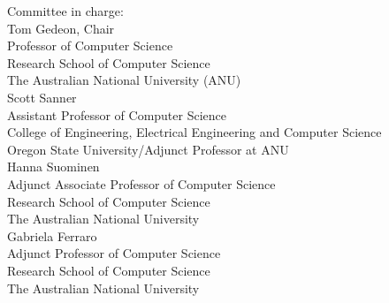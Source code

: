 \noindent
{\Huge{Committee in charge:} }\\[.4cm]
{\LARGE  Tom Gedeon, Chair } \\[.1cm]
{  Professor of Computer Science\\
Research School of Computer Science\\
The Australian National University (ANU)
 }\\[.2cm]
{\LARGE  Scott Sanner } \\[.1cm]
{Assistant Professor of Computer Science\\
College of Engineering,
Electrical Engineering and Computer Science\\
Oregon State University/Adjunct Professor at ANU
 }\\[.2cm]
{\LARGE  Hanna Suominen } \\[.1cm]
{Adjunct Associate Professor of Computer Science\\
Research School of Computer Science\\
The Australian National University
}\\[.2cm]
{\LARGE  Gabriela Ferraro } \\[.1cm]
{Adjunct Professor of Computer Science\\
Research School of Computer Science\\
The Australian National University
}\\[.2cm]



\newpage
%
%
%
